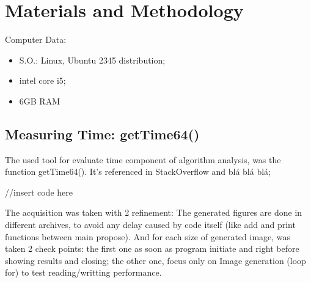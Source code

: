 \section{Materials and Methodology}\label{sec:3}

Computer Data:
  \begin{itemize}
  \item S.O.: Linux, Ubuntu 2345 distribution;
  \item intel core i5;
  \item 6GB RAM
  \end{itemize}

\subsection{Measuring Time: getTime64()}
        The used tool for evaluate time component of algorithm analysis, was the function getTime64(). It's referenced in StackOverflow and blá blá blá;

        //insert code here

        The acquisition was taken with 2 refinement: The generated figures are done in different archives, to avoid any delay caused by code itself (like add and print functions between main propose).
        And for each size of generated image, was taken 2 check points: the first one as soon as program initiate and right before showing results and closing; the other one, focus only on Image generation (loop for) to test reading/writting performance. 


